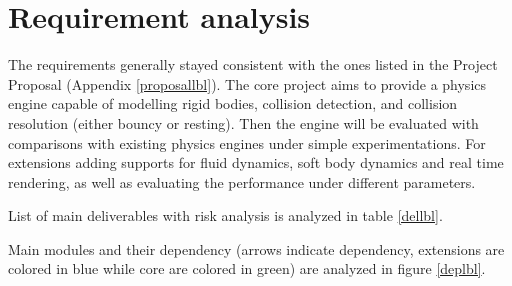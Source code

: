 \documentclass[12pt,a4paper,twoside,openright]{report}
\begin{document}
\section{Requirement analysis}

The requirements generally stayed consistent with the ones listed in the Project Proposal (Appendix \ref{proposallbl}). The core project aims to provide a physics engine capable of modelling rigid bodies, collision detection, and collision resolution (either bouncy or resting). Then the engine will be evaluated with comparisons with existing physics engines under simple experimentations. For extensions adding supports for fluid dynamics, soft body dynamics and real time rendering, as well as evaluating the performance under different parameters.

List of main deliverables with risk analysis is analyzed in table \ref{dellbl}.

\begin{table}[h]
    \centering
    \caption{Risk analysis of main deliverables}
    \label{tab:third_party_software}
    \label{dellbl}
\end{table}

Main modules and their dependency (arrows indicate dependency, extensions are colored in blue while core are colored in green) are analyzed in figure \ref{deplbl}.
\end{document}
